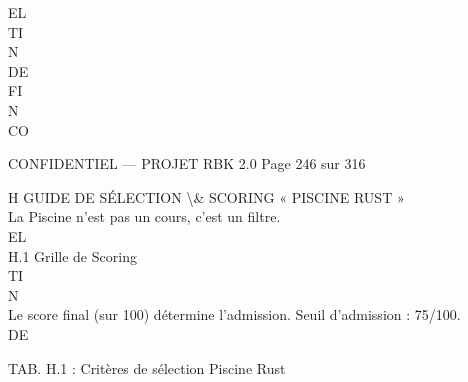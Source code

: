 \vspace{0.5em}
EL\\
TI\\
N\\
DE\\
FI\\
N\\
CO\\
\vspace{0.5em}
\vspace{0.5em}
\vspace{0.5em}
\vspace{0.5em}
\begin{confidential}CONFIDENTIEL — PROJET RBK 2.0                               Page 246 sur 316\end{confidential}
H \textbar{} GUIDE DE SÉLECTION \textbackslash{}& SCORING « PISCINE RUST »\\
\vspace{0.5em}
\vspace{0.5em}
La Piscine n’est pas un cours, c’est un filtre.\\
\vspace{0.5em}
\vspace{0.5em}
\vspace{0.5em}
\vspace{0.5em}
EL\\
H.1 Grille de Scoring\\
\vspace{0.5em}
\vspace{0.5em}
\vspace{0.5em}
\vspace{0.5em}
TI\\
N\\
Le score final (sur 100) détermine l’admission. Seuil d’admission : 75/100.\\
\vspace{0.5em}
\vspace{0.5em}
\vspace{0.5em}
\vspace{0.5em}
DE\\
\begin{center}\begin{tabular}TAB. H.1 : Critères de sélection Piscine Rust\end{tabular}\end{center}
\vspace{0.5em}
\vspace{0.5em}
\vspace{0.5em}
\vspace{0.5em}
